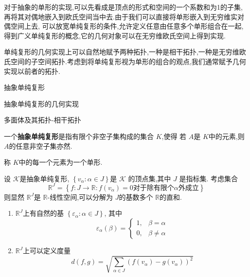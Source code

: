 \documentclass[../../几何与拓扑.tex]{subfiles}
\begin{document}
对于抽象的单形的实现,可以先看成是顶点的形式和空间的一个系数和为1的子集,再将其对偶地嵌入到欧氏空间当中去.由于我们可以直接将单形嵌入到无穷维实对偶空间上去,
可以放宽单纯复形的条件,允许定义任意由任意多个单形组合在一起,得到广义单纯复形的概念,它的几何对象可以在无穷维欧氏空间上得到实现.

单纯复形的几何实现上可以自然地赋予两种拓扑,一种是相干拓扑,一种是无穷维欧氏空间的子空间拓扑.考虑到将单纯复形视为单形的组合的观点,我们通常赋予几何实现以前者的拓扑. 

\begin{introduction}
    \item 抽象单纯复形
    \item 抽象单纯复形的几何实现
    \item 多面体及其拓扑-相干拓扑
\end{introduction}

\begin{definition}
    一个\textbf{抽象单纯复形}是指有限个非空子集构成的集合 \(  K  \),使得 若 \(  A  \)是 \(  K  \)中的元素,则 \(  A  \)的任意非空子集亦然. 
    
    称 \(  K  \)中的每一个元素为一个单形. 
\end{definition}

\begin{definition}
    设 \(  \mathcal{K}  \)是抽象单纯复形, \(  \left\{ v_{ \alpha }: \alpha  \in J \right\}  \)是  \(  \mathcal{K}  \)   的顶点集,其中 \(  J  \) 是指标集.
    考虑集合 \[
    \mathbb{R}^{J} =  \left\{ f: J\to \mathbb{R} : f\left( v_{\alpha } \right)= 0\text{对于除有限个} \alpha \text{外成立}  \right\}
    \]则显然 \(  \mathbb{R}^{J}  \)是 \(  \mathbb{R}   \)-线性空间,可以分解为 \(  J  \)的基数多个 \(  \mathbb{R}   \)的直和.    
\end{definition}

\begin{remark}
    \begin{enumerate}
        \item  \(  \mathbb{R} ^{J}  \)上有自然的基 \(  \left\{ \varepsilon _{\alpha } : \alpha  \in J\right\}  \), 其中 \[
        \varepsilon _{\alpha }\left( \beta  \right) = \begin{cases} 1,&\beta = \alpha \\ 
         0,& \beta \neq \alpha  \end{cases}  
        \]  
        \item \(  \mathbb{R} ^{J}  \)上可以定义度量 \[
        d\left( f,g \right)=  \sqrt{\sum _{\alpha  \in J} \left( f\left( v_{\alpha } \right)-g\left( v_{ \alpha } \right)   \right)^{2} } 
        \] 
    \end{enumerate}
    
\end{remark}
\end{document}
